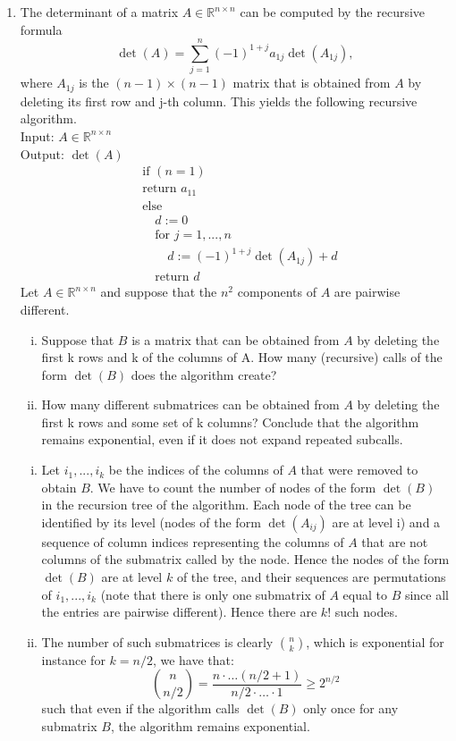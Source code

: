 \documentclass[11pt]{article}
\newcommand{\setR}{\mathbb{R}}
\renewcommand{\geq}{\geqslant}
\begin{document}
\begin{enumerate}[1)]
\item The determinant of a matrix $A∈\setR^{n×n}$ can be computed by the recursive formula
$$\det(A) = \displaystyle\sum_{j=1}^n (-1)^{1+j} a_{1j}\det(A_{1j}), $$
where $A_{1j}$ is the $(n−1)\times(n−1)$ matrix that is obtained from $A$ by deleting its first row and j-th
column. This yields the following recursive algorithm.\\
Input: $A∈\setR^{n×n}$ \\
Output: $\det(A)$\\
\begin{align*}
& \text{if } (n= 1) \\
&\text{return }a_{11}\\
&\text{else} \\
& \quad d:= 0\\
& \quad\text{for }j = 1,...,n\\
& \quad \quad d:= (−1)^{1+j} \det(A_{1j} ) + d \\
&\quad \text{return }d
\end{align*}
Let $A∈\setR^{n×n}$ and suppose that the $n^2$ components of $A$ are pairwise diﬀerent.
\begin{enumerate}[i)]
\item Suppose that $B$ is a matrix that can be obtained from $A$ by deleting the first k rows and k of
the columns of A. How many (recursive) calls of the form $\det(B)$ does the algorithm create?
\item How many diﬀerent submatrices can be obtained from $A$ by deleting the first k rows and some
set of k columns? Conclude that the algorithm remains exponential, even if it does not expand
repeated subcalls.
\end{enumerate}

\begin{solution}
	\begin{enumerate}[i)]
		\item Let $i_1,...,i_k$ be the indices of the columns of $A$ that were removed to obtain $B$. We have to
		count the number of nodes of the form $\det(B)$ in the recursion tree of the algorithm. Each node
		of the tree can be identified by its level (nodes of the form $\det(A_{ij})$ are at level i) and a sequence
		of column indices representing the columns of $A$ that are not columns of the submatrix called
		by the node. Hence the nodes of the form $\det(B)$ are at level $k$ of the tree, and their sequences
		are permutations of $i_1,...,i_k$ (note that there is only one submatrix of $A$ equal to $B$ since all
		the entries are pairwise diﬀerent). Hence there are $k!$ such nodes. 
		\item The number of such submatrices is clearly $\binom{n}{k}$, which is exponential for instance for $k= n/2$, we have that:
		$$\binom{n}{n/2} = \frac{n \cdot \hdots (n/2 + 1)}{n/2 \cdot \hdots \cdot 1} \geq 2^{n/2}$$
		such that even if the algorithm calls $\det(B)$ only once for any submatrix $B$, the algorithm remains exponential.
	\end{enumerate}
\end{solution}

\end{enumerate}



  
\end{document}
